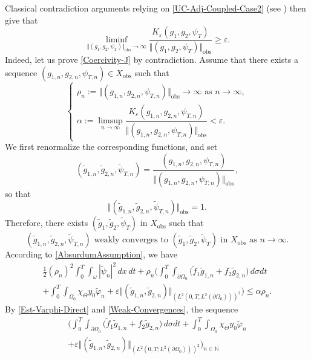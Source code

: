 \documentclass[10pt,a4paper]{amsart}
\newcommand{\obs}{\mathrm{obs}}
\newcommand\N{{\mathbb N}}
\newcommand{\norm}[1]{\Vert#1\Vert}
\theoremstyle{definition}
\begin{document}
Classical contradiction arguments relying on \eqref{UC-Adj-Coupled-Case2} (see \eg \cite{Ervedoza-Note-2020}) then give that
\begin{equation}
\label{Coercivity-J}
\liminf_{\norm{(g_1, g_2, \psi_T)}_{\obs} \to \infty} \frac{K_\varepsilon(g_1, g_2, \psi_T) }{\norm{(g_1, g_2, \psi_T)}_{\obs}} \geq \varepsilon.
\end{equation}
Indeed, let us prove \eqref{Coercivity-J} by contradiction. Assume that there exists a sequence $(g_{1,n}, g_{2,n}, \psi_{T,n}) \in X_{\obs}$ such that
\begin{equation}
\label{AbsurdumAssumption}
\begin{cases}
\rho_n := \norm{(g_{1,n}, g_{2,n}, \psi_{T,n})}_{\obs} \to \infty \text{ as } n \to \infty,\\[3pt]
\alpha:=\limsup_{n \to \infty} \dfrac{K_\varepsilon(g_{1,n}, g_{2,n}, \psi_{T,n})}{\norm{(g_{1,n}, g_{2,n}, \psi_{T,n})}_{\obs}} < \varepsilon.
\end{cases}
\end{equation}
We first renormalize the corresponding functions, and set
\[
(\tilde g_{1,n}, \tilde g_{2,n}, \tilde \psi_{T,n}) = \frac{(g_{1,n}, g_{2,n}, \psi_{T,n})}{ \norm{(g_{1,n}, g_{2,n}, \psi_{T,n})}_{\obs}},
\]
so that
\begin{equation}
\label{Bound-tilde-n}
\norm{(\tilde g_{1,n}, \tilde g_{2,n}, \tilde \psi_{T,n}) }_{\obs} = 1.
\end{equation}
Therefore, there exists $(\tilde g_1, \tilde g_2, \tilde \psi_T)$ in $X_{\obs}$ such that
\begin{equation}
\label{Weak-Convergences}
(\tilde g_{1,n}, \tilde g_{2,n}, \tilde \psi_{T,n}) \text{ weakly converges to }(\tilde g_1, \tilde g_2, \tilde \psi_T) \text{ in } X_{\obs} \text{ as } n \to \infty.
\end{equation}
According to \eqref{AbsurdumAssumption}, we have
\begin{multline}
\label{J-eps-expanded}
\frac{1}{2}(\rho_n)^2 \int_0^T \int_\omega |\tilde \psi_n|^2 \, dx\,dt
+
\rho_n
\biggl(
\int_0^T \int_{\partial \Omega_0} \bigl(\tilde f_1 \tilde g_{1,n} + f_2 \tilde g_{2,n} \bigr) \, d\sigma dt\\
+
\int_0^T \int_{\Omega_0} \chi_{\Theta} y_0 \tilde \varphi_n
+
\varepsilon { \norm{(\tilde g_{1,n}, \tilde g_{2,n})}_{(L^2(0,T; L^2(\partial\Omega_0)))^2}
}
\biggr)
\leq \alpha \rho_n.
\end{multline}
By \eqref{Est-Varphi-Direct} and \eqref{Weak-Convergences}, the sequence
\begin{multline*}
\biggl(
\int_0^T \int_{\partial \Omega_0} \bigl(\tilde f_1 \tilde g_{1,n} + f_2 \tilde g_{2,n} \bigr) \, d\sigma dt
+
\int_0^T \int_{\Omega_0} \chi_{\Theta} y_0 \tilde \varphi_n\\[-10pt]
+
\varepsilon
{ \norm{(\tilde g_{1,n}, \tilde g_{2,n})}_{(L^2(0,T; L^2(\partial\Omega_0)))^2}}
\biggr)_{n \in \N}
\end{multline*}
\end{document}
